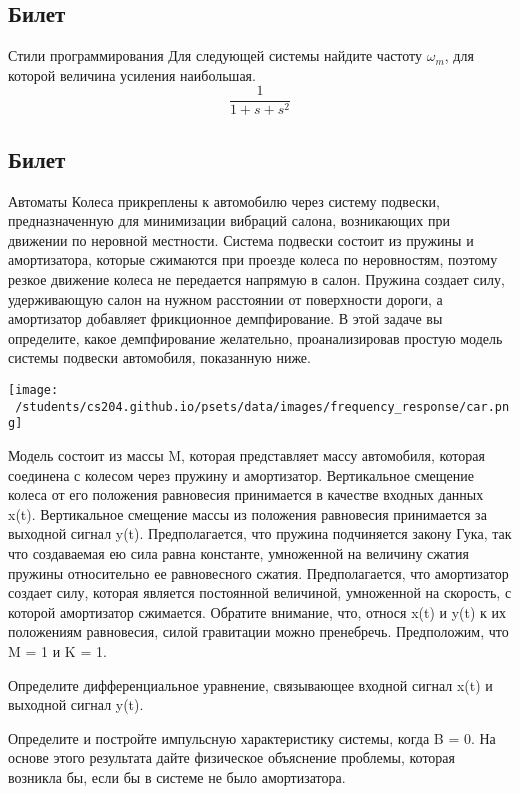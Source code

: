 \documentclass{exam}
\begin{document}
\begin{questions}
\section{Билет}
	\question 
		Стили программирования
	\question 
Для следующей системы найдите частоту \(\omega_m\), 
для которой величина усиления наибольшая.
	\[	
		\frac{1}{1+s+s^2}
		\]
\end{questions}
\vspace{15pt}

\newpage
\begin{questions}
\section{Билет}
	\question 
		Автоматы
	\question
Колеса прикреплены к автомобилю через систему подвески, 
предназначенную для минимизации вибраций салона, возникающих 
при движении по неровной местности.
Система подвески состоит из пружины и амортизатора, которые 
сжимаются при проезде колеса по неровностям, поэтому резкое 
движение колеса не передается напрямую в салон.
Пружина создает силу, удерживающую салон на нужном расстоянии 
от поверхности дороги, а амортизатор добавляет фрикционное демпфирование.
В этой задаче вы определите, какое демпфирование желательно, 
проанализировав простую модель системы подвески автомобиля, показанную ниже.


	\texttt{[image: ~/students/cs204.github.io/psets/data/images/frequency\_response/car.png]}

Модель состоит из массы M, которая представляет массу автомобиля, 
которая соединена с колесом через пружину и амортизатор.
Вертикальное смещение колеса от его положения равновесия принимается 
в качестве входных данных x(t).
Вертикальное смещение массы из положения равновесия принимается за выходной сигнал y(t).
Предполагается, что пружина подчиняется закону Гука, так что создаваемая 
ею сила равна константе, умноженной на величину сжатия пружины относительно 
ее равновесного сжатия.
Предполагается, что амортизатор создает силу, которая является постоянной 
величиной, умноженной на скорость, с которой амортизатор сжимается.
Обратите внимание, что, относя x(t) и y(t) к их положениям равновесия, 
силой гравитации можно пренебречь.
Предположим, что M = 1 и K = 1.
	
Определите дифференциальное уравнение, связывающее входной 
		сигнал x(t) и выходной сигнал y(t).

Определите и постройте импульсную характеристику системы, когда B = 0.
На основе этого результата дайте физическое объяснение проблемы, 
которая возникла бы, если бы в системе не было амортизатора.
	
\end{questions}
\end{document}
